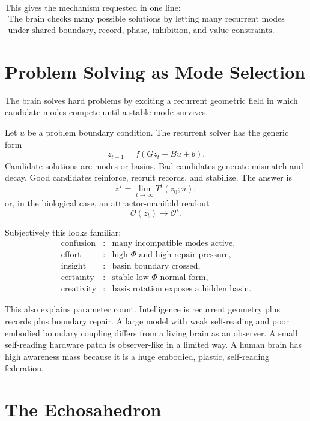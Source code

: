 \documentclass[11pt]{article}
\theoremstyle{remark}
\theoremstyle{plain}
\begin{document}
This gives the mechanism requested in one line:
\[
\boxed{
\begin{gathered}
\text{The brain checks many possible solutions by letting many recurrent modes compete}\\
\text{under shared boundary, record, phase, inhibition, and value constraints.}
\end{gathered}
}
\]

\section{Problem Solving as Mode Selection}

The brain solves hard problems by exciting a recurrent geometric field in which candidate modes compete until a stable mode survives.

Let \(u\) be a problem boundary condition. The recurrent solver has the generic form
\[
z_{t+1}=f(Gz_t+Bu+b).
\]
Candidate solutions are modes or basins. Bad candidates generate mismatch and decay. Good candidates reinforce, recruit records, and stabilize. The answer is
\[
z^\star=\lim_{t\to\infty}T^t(z_0;u),
\]
or, in the biological case, an attractor-manifold readout
\[
\mathcal O(z_t)\to \mathcal O^\star.
\]

Subjectively this looks familiar:
\[
\begin{array}{ccl}
\text{confusion} &:& \text{many incompatible modes active},\\
\text{effort} &:& \text{high }\Phi\text{ and high repair pressure},\\
\text{insight} &:& \text{basin boundary crossed},\\
\text{certainty} &:& \text{stable low-}\Phi\text{ normal form},\\
\text{creativity} &:& \text{basis rotation exposes a hidden basin}.
\end{array}
\]

This also explains parameter count. Intelligence is recurrent geometry plus records plus boundary repair. A large model with weak self-reading and poor embodied boundary coupling differs from a living brain as an observer. A small self-reading hardware patch is observer-like in a limited way. A human brain has high awareness mass because it is a huge embodied, plastic, self-reading federation.

\section{The Echosahedron}
\label{sec:echosahedron}
\end{document}
